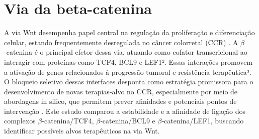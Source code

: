 \section{Via da beta-catenina}

A via Wnt desempenha papel central na regulação da proliferação e diferenciação celular, estando frequentemente desregulada no câncer colorretal (CCR) \cite{Liu2022}. A $\beta$‑catenina é o principal efetor dessa via, atuando como cofator transcricional ao interagir com proteínas como TCF4, BCL9 e LEF1². Essas interações promovem a ativação de genes relacionados à progressão tumoral e resistência terapêutica³. O bloqueio seletivo dessas interfaces
desponta como estratégia promissora para o desenvolvimento de novas terapias‑alvo no CCR, especialmente por meio de abordagens in silico, que permitem prever afinidades e potenciais pontos de intervenção \cite{Liu2022}. Este estudo comparou a estabilidade e a afinidade de ligação dos complexos $\beta$‑catenina/TCF4, $\beta$‑catenina/BCL9 e $\beta$‑catenina/LEF1, buscando identificar possíveis alvos terapêuticos na via Wnt.